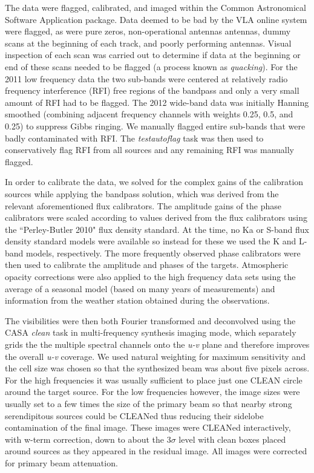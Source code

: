 \documentclass[iop]{emulateapj}
\begin{document}
The data were flagged, calibrated, and imaged within the Common Astronomical Software Application  \cite[CASA;][]{2007ASPC..376..127M} package. Data deemed to be bad by the VLA online system were flagged, as were pure zeros, non-operational antennas antennas, dummy scans at the beginning of each track, and poorly performing antennas. Visual inspection of each scan was carried out to determine if data at the beginning or end of these scans needed to be flagged (a process known as \textit{quacking}). For the 2011 low frequency data the two sub-bands were centered at relatively radio frequency interference (RFI) free regions of the bandpass and only a very small amount of RFI had to be flagged.   The 2012 wide-band data was initially Hanning smoothed (combining adjacent frequency channels with weights 0.25, 0.5, and 0.25) to suppress Gibbs ringing. We manually flagged entire sub-bands that were badly contaminated with RFI. The \textit{testautoflag} task was then used to conservatively flag RFI from all sources and any remaining RFI was manually flagged. 

In order to calibrate the data, we solved for the complex gains of the calibration sources while applying the bandpass solution, which was derived from the relevant aforementioned flux calibrators.  The amplitude gains of the phase calibrators were scaled according to values derived from the flux calibrators using the ``Perley-Butler 2010" flux density standard. At the time, no Ka or S-band flux density standard models were available so instead for these we used the K and L-band models, respectively. The more frequently observed phase calibrators were then used to calibrate the amplitude and phases of the targets. Atmospheric opacity corrections were also applied to the high frequency data sets using the average of a seasonal model (based on many years of measurements) and information from the weather station obtained during the observations.

The visibilities were then both Fourier transformed and deconvolved using the CASA \textit{clean} task in multi-frequency synthesis imaging mode, which separately grids the the multiple spectral channels onto the \textit{u-v} plane and therefore improves the overall \textit{u-v} coverage. We used natural weighting for maximum sensitivity and the cell size was chosen so that the synthesized beam was about five pixels across. For the high frequencies it was usually sufficient to place just one CLEAN circle around the target source.  For the low frequencies however, the image sizes were usually set to a few times the size of the primary beam so that nearby strong serendipitous sources could be CLEANed thus reducing their sidelobe contamination of the final image. These images were CLEANed interactively, with w-term correction, down to about the $3\sigma$  level with clean boxes placed around sources as they appeared in the residual image. All images were corrected for  primary beam attenuation. 
\end{document}

